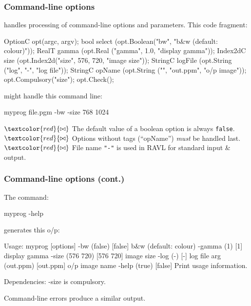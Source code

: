 \documentclass[landscape]{beamer}
\begin{document}
\begin{frame}[fragile]\frametitle{Command-line options}

   handles processing of command-line options and parameters.
This code fragment:

\begin{Code}
  OptionC opt(argc, argv);
  bool select     (opt.Boolean("bw",       "b&w (default: colour)"));
  RealT gamma     (opt.Real   ("gamma", 1.0,       "display gamma"));
  Index2dC size   (opt.Index2d("size",  576, 720,  "image size"));
  StringC logFile (opt.String ("log",   "-",       "log file"));
  StringC opName  (opt.String ("",      "out.ppm", "o/p image"));
  opt.Compulsory("size");
  opt.Check();
\end{Code}

\pause \vfill might handle this command line:\\[1ex]

\begin{VerbatimXterm}
  myprog file.pgm -bw -size 768 1024
\end{VerbatimXterm}

\pause\vfill
$\textcolor{red}{\bowtie}$ The default value of a boolean option is always {\tt false}.\\
$\textcolor{red}{\bowtie}$ Options without tags (``opName'') {\em must} be handled last.\\
$\textcolor{red}{\bowtie}$ File name {\tt "-"} is used in RAVL for standard input \& output.\\

\end{frame}

\begin{frame}[fragile]\frametitle{Command-line options (cont.)}

The command:

\begin{VerbatimXterm}
myprog -help
\end{VerbatimXterm}

generates this o/p:


\begin{VerbatimXterm}
Usage: myprog [options] 
   -bw (false) [false] b&w (default: colour)
   -gamma (1) [1] display gamma 
   -size (576 720) [576 720] image size
   -log (-) [-] log file 
   arg (out.ppm) [out.ppm] o/p image name 
   -help (true) [false] Print usage information. 

Dependencies:
   -size is compulsory.
\end{VerbatimXterm}

\pause Command-line errors produce a similar output.

\end{frame}
\end{document}
